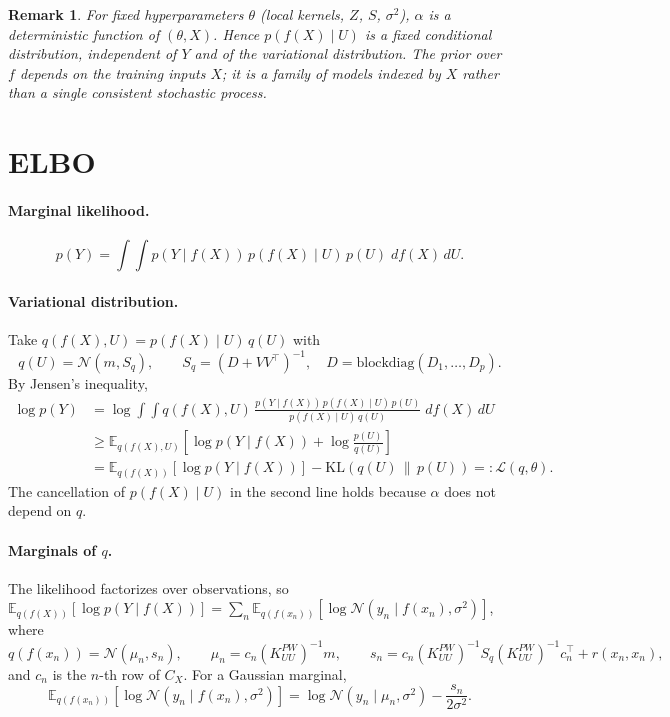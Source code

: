 \documentclass[11pt]{article}
\newcommand{\iKUU}{(K^{PW}_{UU})^{-1}}
\newcommand{\N}{\mathcal N}
\newcommand{\KL}{\mathrm{KL}}
\newtheorem{remark}{Remark}
\begin{document}
\begin{remark}
For fixed hyperparameters $\theta$ (local kernels, $Z$, $S$, $\sigma^2$), $\alpha$ is a
deterministic function of $(\theta, X)$. Hence $p(f(X)\mid U)$ is a fixed conditional
distribution, independent of $Y$ and of the variational distribution. The prior over $f$
depends on the training inputs $X$; it is a family of models indexed by $X$ rather than a
single consistent stochastic process.
\end{remark}

\section{ELBO}

\paragraph{Marginal likelihood.}
\[
p(Y) = \int\!\!\int p(Y\mid f(X))\, p(f(X)\mid U)\, p(U)\; df(X)\, dU .
\]

\paragraph{Variational distribution.}
Take $q(f(X),U) = p(f(X)\mid U)\, q(U)$ with
\[
q(U) = \N(m, S_q), \qquad S_q = (D + VV^\top)^{-1}, \quad D = \mathrm{blockdiag}(D_1,\dots,D_p).
\]
By Jensen's inequality,
\begin{align*}
\log p(Y)
&= \log \int\!\!\int q(f(X),U)\,
\frac{p(Y\mid f(X))\, p(f(X)\mid U)\, p(U)}{p(f(X)\mid U)\, q(U)}\; df(X)\, dU \\
&\ge \mathbb E_{q(f(X),U)}\!\left[\log p(Y\mid f(X)) + \log\frac{p(U)}{q(U)}\right] \\
&= \mathbb E_{q(f(X))}\!\left[\log p(Y\mid f(X))\right] - \KL\!\left(q(U)\,\|\,p(U)\right)
=: \mathcal L(q,\theta).
\end{align*}
The cancellation of $p(f(X)\mid U)$ in the second line holds because $\alpha$ does not
depend on $q$.

\paragraph{Marginals of $q$.}
The likelihood factorizes over observations, so
$\mathbb E_{q(f(X))}[\log p(Y\mid f(X))] = \sum_n \mathbb E_{q(f(x_n))}[\log\N(y_n\mid f(x_n),\sigma^2)]$, where
\[
q(f(x_n)) = \N(\mu_n, s_n), \qquad
\mu_n = c_n \iKUU m, \qquad
s_n = c_n \iKUU S_q \iKUU c_n^\top + r(x_n,x_n),
\]
and $c_n$ is the $n$-th row of $C_X$. For a Gaussian marginal,
\[
\mathbb E_{q(f(x_n))}\!\left[\log\N(y_n\mid f(x_n),\sigma^2)\right]
= \log\N(y_n\mid \mu_n,\sigma^2) - \frac{s_n}{2\sigma^2}.
\]
\end{document}
